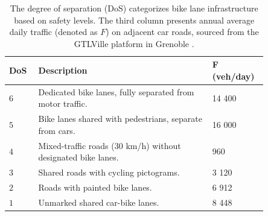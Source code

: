 \documentclass[lettersize,journal]{IEEEtran}
\begin{document}




\begin{table}[t]
\centering
\vspace{0.2cm}
\begin{tabular}{|>{\centering\arraybackslash}p{0.1\linewidth}|p{0.60
\linewidth}|C{0.15\linewidth}|}
\hline
\textbf{DoS}   & \textbf{Description} & F \textbf{ (veh/day)} \\
\hline
$6$  & Dedicated bike lanes, fully separated from motor traffic. & 14 400 \\

$5$  & Bike lanes shared with pedestrians, separate from cars. & 16 000 \\ 

$4$  & Mixed-traffic roads (30 km/h) without designated bike lanes. & 960  \\

$3$  & Shared roads with cycling pictograms. & 3 120 \\

$2$  & Roads with painted bike lanes.  & 6 912 \\

$1$  & Unmarked shared car-bike lanes. & 8 448 \\
\hline
\end{tabular}
\caption{\footnotesize The degree of separation (DoS) categorizes bike lane infrastructure based on safety levels. The third column presents annual average daily traffic (denoted as $F$) on adjacent car roads, sourced from the GTLVille platform in Grenoble \cite{gtlville2024}.}
\label{dos_table}
\end{table}
\end{document}

